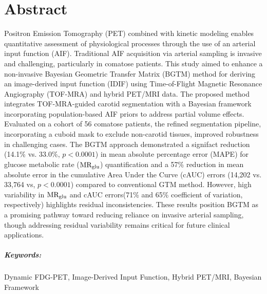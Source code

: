 \chapter*{Abstract}

Positron Emission Tomography (PET) combined with kinetic modeling enables quantitative assessment of physiological processes through the use of an arterial input function (AIF).
Traditional AIF acquisition via arterial sampling is invasive and challenging, particularly in comatose patients.
This study aimed to enhance a non-invasive Bayesian Geometric Transfer Matrix (BGTM) method for deriving an image-derived input function (IDIF) using Time-of-Flight Magnetic Resonance Angiography (TOF-MRA) and hybrid PET/MRI data.
The proposed method integrates TOF-MRA-guided carotid segmentation with a Bayesian framework incorporating population-based AIF priors to address partial volume effects.
Evaluated on a cohort of 56 comatose patients, the refined segmentation pipeline, incorporating a cuboid mask to exclude non-carotid tissues, improved robustness in challenging cases.
The BGTM approach demonstrated a signifact reduction (14.1\% vs. 33.0\%, $p<0.0001$) in mean absolute percentage error (MAPE) for glucose metabolic rate ($\text{MR}_{\text{glu}}$) quantification and a 57\% reduction in mean absolute error in the cumulative Area Under the Curve (cAUC) errors (14,202 vs. 33,764 vs, $p<0.0001$) compared to conventional GTM method.
However, high variability in $\text{MR}_{\text{glu}}$ and cAUC errors(71\% and 65\% coefficient of variation, respectively) highlights residual inconsistencies.
These results position BGTM as a promising pathway toward reducing reliance on invasive arterial sampling, though addressing residual variability remains critical for future clinical applications.

\paragraph{Keywords:} Dynamic FDG-PET, Image-Derived Input Function, Hybrid PET/MRI, Bayesian Framework

